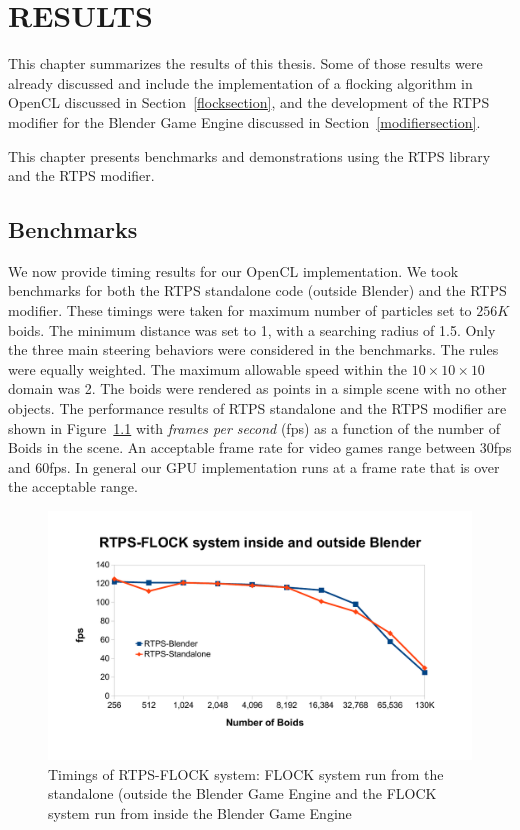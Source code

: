 \chapter{RESULTS}\label{resultsChapter}

This chapter summarizes the results of this thesis. Some of those results were already discussed and include the implementation of a flocking algorithm in OpenCL discussed in Section~\ref{flocksection}, and the development of the RTPS modifier for the Blender Game Engine discussed in Section~\ref{modifiersection}. 

This chapter presents benchmarks and demonstrations using the RTPS library and the RTPS modifier.

\section{Benchmarks}

We now provide timing results for our OpenCL implementation. We took benchmarks for both the RTPS standalone code (outside Blender) and the RTPS modifier. These timings were taken for maximum number of particles set to $256K$ boids. The minimum distance was set to 1, with a searching radius of 1.5. Only the three main steering behaviors were considered in the benchmarks. The rules were equally weighted. The maximum allowable speed within the $10\times 10\times 10$ domain was 2. The boids were rendered as points in a simple scene with no other objects. The performance results of RTPS standalone and the RTPS modifier are shown in Figure~\ref{RTPSvsRTPS} with \textit{frames per second} (fps) as a function of 
the number of Boids in the scene. 
An acceptable frame rate for video games range between 30fps and 60fps. In general our GPU implementation runs at a frame rate that is over the acceptable range. 

\begin{figure}[htbp]
\begin{center}
\includegraphics[scale=0.7]{figures/RTPSvsRTPS.pdf}
\caption{Timings of RTPS-FLOCK system: FLOCK system run from the standalone (outside the Blender Game Engine and the FLOCK system run from inside the Blender Game Engine}
\label{RTPSvsRTPS}
\end{center}
\end{figure}

